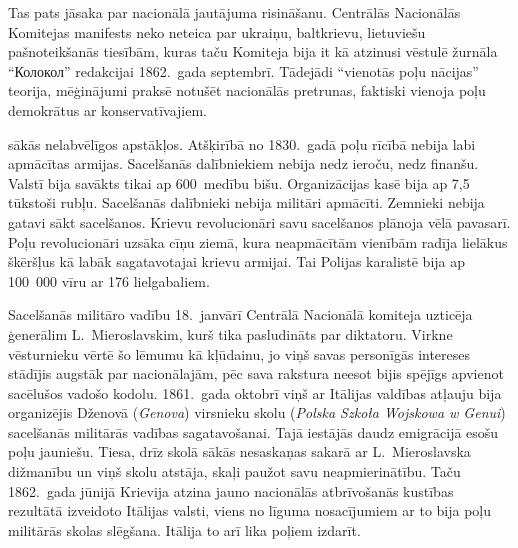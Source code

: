 \documentclass[twoside,a5paper,12pt,fleqn,openany]{extbook}
\newcommand{\pltxti}[1]{\textit{\textpolish{#1}}}
\newcommand{\rutxti}[1]{\textrussian{#1}}
\begin{document}
Tas pats jāsaka par nacionālā jautājuma risināšanu. Centrālās Nacionālās Komitejas manifests neko neteica par ukraiņu, baltkrievu, lietuviešu pašnoteikšanās tiesībām, kuras taču Komiteja bija it kā atzinusi vēstulē žurnāla ``\rutxti{Колокол}'' redakcijai 1862.~gada septembrī. Tādejādi ``vienotās poļu nācijas'' teorija, mēģinājumi praksē notušēt nacionālās pretrunas, faktiski vienoja poļu demokrātus ar konservatīvajiem.

 sākās nelabvēlīgos apstākļos. Atšķirībā no 1830.~gadā poļu rīcībā nebija labi apmācītas armijas. Sacelšanās dalībniekiem nebija nedz ieroču, nedz finanšu. Valstī bija savākts tikai ap 600~medību bišu. Organizācijas kasē bija ap 7,5 tūkstoši rubļu. Sacelšanās dalībnieki nebija militāri apmācīti. Zemnieki nebija gatavi sākt sacelšanos. Krievu revolucionāri savu sacelšanos plānoja vēlā pavasarī. Poļu revolucionāri uzsāka cīņu ziemā, kura neapmācītām vienībām radīja lielākus škēršļus kā labāk sagatavotajai krievu armijai. Tai Polijas karalistē bija ap 100~000 vīru ar 176 lielgabaliem.

Sacelšanās militāro vadību 18.~janvārī Centrālā Nacionālā komiteja uzticēja ģenerālim L.~Mieroslavskim, kurš tika pasludināts par diktatoru. Virkne vēsturnieku vērtē šo lēmumu kā kļūdainu, jo viņš savas personīgās intereses stādījis augstāk par nacionālajām, pēc sava rakstura neesot bijis spējīgs apvienot sacēlušos vadošo kodolu. 1861.~gada oktobrī viņš ar Itālijas valdības atļauju bija organizējis Dženovā (\pltxti{Genova}) virsnieku skolu (\pltxti{Polska Szkoła Wojskowa w Genui}) sacelšanās militārās vadības sagatavošanai. Tajā iestājās daudz emigrācijā esošu poļu jauniešu. Tiesa, drīz skolā sākās nesaskaņas sakarā ar L.~Mieroslavska dižmanību un viņš skolu atstāja, skaļi paužot savu neapmierinātību. Taču 1862.~gada jūnijā Krievija atzina jauno nacionālās atbrīvošanās kustības rezultātā izveidoto Itālijas valsti, viens no līguma nosacījumiem ar to bija poļu militārās skolas slēgšana. Itālija to arī lika poļiem izdarīt.
\end{document}
